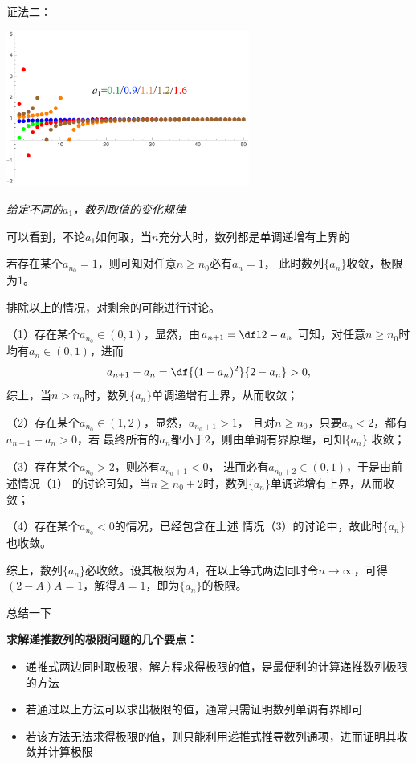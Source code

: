 证法二：
\begin{center}
	\includegraphics[width=8cm]{./images/ch01/a2a.pdf}
	
	\it 给定不同的$a_1$，数列取值的变化规律
	
	可以看到，不论$a_1$如何取，当$n$充分大时，数列都是单调递增有上界的
\end{center}

若存在某个$a_{n_0}=1$，则可知对任意$n\geq n_0$必有$a_n=1$，
此时数列$\{a_n\}$收敛，极限为$1$。

排除以上的情况，对剩余的可能进行讨论。

（1）存在某个$a_{n_0}\in(0,1)$，显然，由$a_{n+1}=\df1{2-a_n}$
可知，对任意$n\geq n_0$时均有$a_n\in(0,1)$，进而
$$a_{n+1}-a_n=\df{(1-a_n)^2}{2-a_n}>0,$$
综上，当$n>n_0$时，数列$\{a_n\}$单调递增有上界，从而收敛；

（2）存在某个$a_{n_0}\in(1,2)$，显然，$a_{n_0+1}>1$，
且对$n\geq n_0$，只要$a_n<2$，都有$a_{n+1}-a_n>0$，若
最终所有的$a_n$都小于$2$，则由单调有界原理，可知$\{a_n\}$
收敛；

（3）存在某个$a_{n_0}>2$，则必有$a_{n_0+1}<0$，
进而必有$a_{n_0+2}\in(0,1)$，于是由前述情况（1）
的讨论可知，当$n\geq n_0+2$时，数列$\{a_n\}$单调递增有上界，从而收敛；

（4）存在某个$a_{n_0}<0$的情况，已经包含在上述
情况（3）的讨论中，故此时$\{a_n\}$也收敛。

综上，数列$\{a_n\}$必收敛。设其极限为$A$，在以上等式两边同时令$n\to\infty$，可得
$(2-A)A=1$，解得$A=1$，即为$\{a_n\}$的极限。\fin
\fi

总结一下
\begin{thx}
	{\bf 求解递推数列的极限问题的几个要点：}
	\begin{itemize}
	  \item 递推式两边同时取极限，解方程求得极限的值，是最便利的计算递推数列极限的方法
	  \item 若通过以上方法可以求出极限的值，通常只需证明数列单调有界即可
	  \item 若该方法无法求得极限的值，则只能利用递推式推导数列通项，进而证明其收敛并计算极限
	\end{itemize}
\end{thx}

